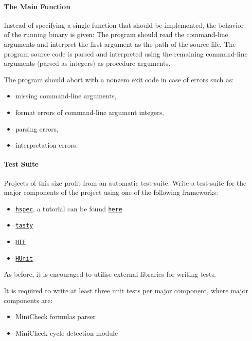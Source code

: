 \documentclass{article}
\begin{document}
\paragraph{The Main Function}

Instead of specifying a single function that should be implemented, the behavior of the running binary is given: The program should read the command-line arguments and interpret the first argument as the path of the source file. The program source code is parsed and interpreted using the remaining command-line arguments (parsed as integers) as procedure arguments.

The program should abort with a nonzero exit code in case of errors such as:

\begin{itemize}
\item missing command-line arguments,
\item format errors of command-line argument integers,
\item parsing errors,
\item interpretation errors.
\end{itemize}

\paragraph{Test Suite}

Projects of this size profit from an automatic test-suite. Write a test-suite for the major components of the project using one of the following frameworks:

\begin{itemize}
\item \href{https://hackage.haskell.org/package/hspec}{\texttt{hspec}}, a tutorial can be found \href{https://hspec.github.io/}{\texttt{here}}
\item \href{https://hackage.haskell.org/package/tasty}{\texttt{tasty}}
\item \href{https://hackage.haskell.org/package/HTF}{\texttt{HTF}}
\item \href{https://hackage.haskell.org/package/HUnit}{\texttt{HUnit}}
\end{itemize}

As before, it is encouraged to utilise external libraries for writing tests.

It is required to write at least three unit tests per major component, where major components are:

\begin{itemize}
\item MiniCheck formulas parser
\item MiniCheck cycle detection module
\end{itemize}
\end{document}
